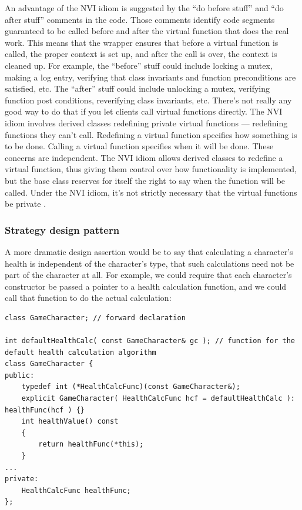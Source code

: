 \documentclass[a4paper,12pt,notitlepage]{article}
\begin{document}
An advantage of the NVI idiom is suggested by the “do before stuff” and “do after stuff” comments in the code. Those comments identify code segments guaranteed to be called before and after the virtual
function that does the real work. This means that the wrapper ensures that before a virtual function is called, the proper context is set up, and after the call is over, the context is cleaned up. For example, the “before” stuff could include locking a mutex, making a log entry, verifying that class invariants and function preconditions are satisfied, etc. The “after” stuff could include unlocking a mutex, verifying function post conditions, reverifying class invariants, etc. There's not really any good way to do that if you let clients call virtual functions directly. The NVI idiom involves derived classes redefining private virtual functions — redefining functions they can't call. Redefining a virtual function specifies how something is to be done. Calling a virtual function specifies when it will be done. These concerns are independent. The NVI idiom allows derived classes to redefine a virtual function, thus giving them control over how functionality is implemented, but the base class reserves for itself the right to say when the function will be called. Under the NVI idiom, it's not strictly necessary that the virtual functions be private \cite{Meyers_eff}.


\subsubsection{Strategy design pattern}

A more dramatic design assertion would be to say that calculating a character's health is independent of the character's type, that such calculations need not be part of the character at all. For example, we could require that each character's constructor be passed a pointer to a health calculation function, and we could call that function to do the actual calculation:

\begin{verbatim}
class GameCharacter; // forward declaration

int defaultHealthCalc( const GameCharacter& gc ); // function for the default health calculation algorithm
class GameCharacter {
public:
    typedef int (*HealthCalcFunc)(const GameCharacter&);
    explicit GameCharacter( HealthCalcFunc hcf = defaultHealthCalc ): healthFunc(hcf ) {}
    int healthValue() const
    { 
        return healthFunc(*this); 
    }
...
private:
    HealthCalcFunc healthFunc;
};
\end{verbatim}
\end{document}

